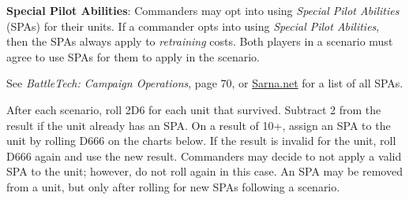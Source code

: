 \item {\bfseries Special Pilot Abilities}: Commanders may opt into using \emph{Special Pilot Abilities} (SPAs) for their units.
If a commander opts into using \emph{Special Pilot Abilities}, then the SPAs always apply to \emph{retraining} costs.
Both players in a scenario must agree to use SPAs for them to apply in the scenario.

See \emph{BattleTech: Campaign Operations}, page 70, or \href{https://sarna.net}{Sarna.net} for a list of all SPAs.

After each scenario, roll 2D6 for each unit that survived.
Subtract 2 from the result if the unit already has an SPA.
On a result of 10+, assign an SPA to the unit by rolling D666 on the charts below.
If the result is invalid for the unit, roll D666 again and use the new result.
Commanders may decide to not apply a valid SPA to the unit; however, do not roll again in this case.
An SPA may be removed from a unit, but only after rolling for new SPAs following a scenario.
